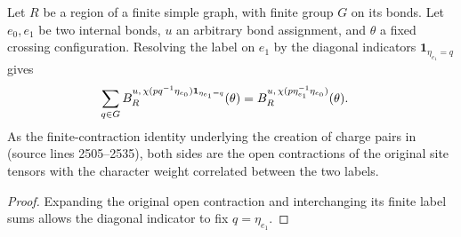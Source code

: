\begin{lemma}
    \label{thm:peps_closed_charge_pair_resolution}
    \leanok
    Let $R$ be a region of a finite simple graph, with finite group $G$ on its
    bonds. Let $e_0,e_1$ be two internal bonds, $u$ an arbitrary bond assignment,
    and $\theta$ a fixed crossing configuration. Resolving the label on $e_1$
    by the diagonal indicators $\mathbf{1}_{\eta_{e_1}=q}$ gives
    \begin{align}
        \sum_{q\in G} B_R^{u,\,\chi(pq^{-1}\eta_{e_0})
                \mathbf{1}_{\eta_{e_1}=q}}(\theta)
         & =B_R^{u,\,\chi(p\eta_{e_1}^{-1}\eta_{e_0})}(\theta).\notag
    \end{align}
    As the finite-contraction identity underlying the creation of charge
    pairs in \cite[Section~6.6]{Schuch2010PEPS} (source lines 2505--2535),
    both sides are the open contractions of the original site tensors with the
    character weight correlated between the two labels.
\end{lemma}
\begin{proof}\leanok
    Expanding the original open contraction and interchanging its finite label
    sums allows the diagonal indicator to fix $q=\eta_{e_1}$.
\end{proof}

